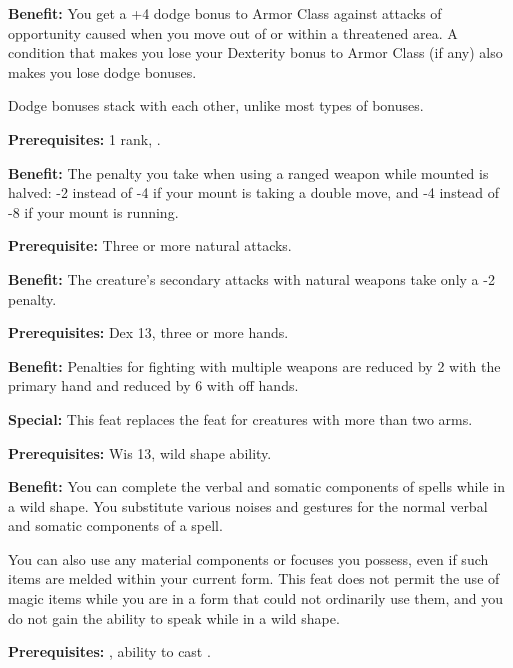 \textbf{Benefit:} You get a +4 dodge bonus to Armor Class against attacks of opportunity caused when you move out of or within a threatened area. A condition that makes you lose your Dexterity bonus to Armor Class (if any) also makes you lose dodge bonuses.

Dodge bonuses stack with each other, unlike most types of bonuses.


\textbf{Prerequisites:}  1 rank, .

\textbf{Benefit:} The penalty you take when using a ranged weapon while mounted is halved: -2 instead of -4 if your mount is taking a double move, and -4 instead of -8 if your mount is running.


\textbf{Prerequisite:} Three or more natural attacks.

\textbf{Benefit:} The creature's secondary attacks with natural weapons take only a -2 penalty.


\textbf{Prerequisites:} Dex 13, three or more hands.

\textbf{Benefit:} Penalties for fighting with multiple weapons are reduced by 2 with the primary hand and reduced by 6 with off hands.

\textbf{Special:} This feat replaces the  feat for creatures with more than two arms.


\textbf{Prerequisites:} Wis 13, wild shape ability.

\textbf{Benefit:} You can complete the verbal and somatic components of spells while in a wild shape. You substitute various noises and gestures for the normal verbal and somatic components of a spell.

You can also use any material components or focuses you possess, even if such items are melded within your current form. This feat does not permit the use of magic items while you are in a form that could not ordinarily use them, and you do not gain the ability to speak while in a wild shape.


\textbf{Prerequisites:} , ability to cast .

